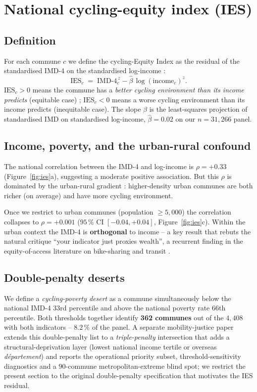 \documentclass[11pt,a4paper]{article}
\newcommand{\IMD}{\mathrm{IMD}}
\newcommand{\IES}{\mathrm{IES}}
\begin{document}
\section{National cycling-equity index (IES)}
\label{sec:ies}

\subsection{Definition}

For each commune $c$ we define the cycling-Equity Index as
the residual of the standardised IMD-4 on the standardised
log-income :
\[
    \IES_c \;=\; \IMD\text{-}4_c^{\,z}
                  - \widehat{\beta}\, \log(\text{income}_c)^{z}.
\]
$\IES_c > 0$ means the commune has a \emph{better cycling
environment than its income predicts} (equitable case) ;
$\IES_c < 0$ means a worse cycling environment than its income
predicts (inequitable case).  The slope $\widehat{\beta}$ is the
least-squares projection of standardised IMD on standardised
log-income, $\widehat{\beta} = 0.02$ on our $n = 31{,}266$ panel.

\subsection{Income, poverty, and the urban-rural confound}

The national correlation between the IMD-4 and log-income is
$\rho = +0.33$ (Figure~\ref{fig:ies}a), suggesting a moderate
positive association.  But this $\rho$ is dominated by the
urban-rural gradient : higher-density urban communes are both
richer (on average) and have more cycling environment.

Once we restrict to urban communes (population $\geq 5{,}000$)
the correlation collapses to $\rho = +0.001$ ($95\,\%$ CI
$[-0.04, +0.04]$, Figure~\ref{fig:ies}c).  Within the urban
context the IMD-4 is \textbf{orthogonal} to income -- a key
result that rebuts the natural critique ``your indicator just
proxies wealth'', a recurrent finding in the equity-of-access
literature on bike-sharing and transit
\citep{Smith2015,Hosford2018,ElGeneidy2016}.

\subsection{Double-penalty deserts}

We define a \emph{cycling-poverty desert} as a commune
simultaneously below the national IMD-4 33rd percentile and
above the national poverty rate 66th percentile.  Both thresholds
together identify \textbf{362 communes} out of the $4{,}408$ with
both indicators -- $8.2\,\%$ of the panel.  A separate
mobility-justice paper \citep{FossePallares2026cyclingPoverty}
extends this double-penalty list to a \emph{triple-penalty}
intersection that adds a structural-deprivation layer (lowest
national income tertile or overseas \emph{d\'epartement}) and
reports the operational priority subset, threshold-sensitivity
diagnostics and a $90$-commune metropolitan-extreme blind spot;
we restrict the present section to the original double-penalty
specification that motivates the IES residual.
\end{document}
